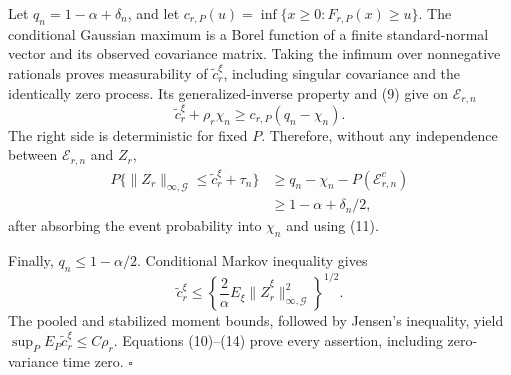 Let \(q_n=1-\alpha+\delta_n\), and let
\(c_{r,P}(u)=\inf\{x\ge0:F_{r,P}(x)\ge u\}\). The conditional Gaussian maximum is a Borel function of a finite standard-normal vector and its observed covariance matrix. Taking the infimum over nonnegative rationals proves measurability of \(\widetilde c_r^\xi\), including singular covariance and the identically zero process. Its generalized-inverse property and (9) give on \(\mathcal E_{r,n}\)
\[
 \widetilde c_r^\xi+\rho_r\chi_n
 \ge c_{r,P}(q_n-\chi_n).                                 \tag{12}
\]
The right side is deterministic for fixed \(P\). Therefore, without any independence between \(\mathcal E_{r,n}\) and \(Z_r\),
\[
\begin{aligned}
 P\{\|Z_r\|_{\infty,\mathcal G}\le
 \widetilde c_r^\xi+\tau_n\}
 &\ge q_n-\chi_n-P(\mathcal E_{r,n}^c)\\
 &\ge1-\alpha+\delta_n/2,
\end{aligned}                                             \tag{13}
\]
after absorbing the event probability into \(\chi_n\) and using (11).

Finally, \(q_n\le1-\alpha/2\). Conditional Markov inequality gives
\[
 \widetilde c_r^\xi\le
 \left\{\frac2\alpha E_\xi
 \|\widehat Z_r^\xi\|_{\infty,\mathcal G}^2\right\}^{1/2}. \tag{14}
\]
The pooled and stabilized moment bounds, followed by Jensen's inequality, yield
\(\sup_PE_P\widetilde c_r^\xi\le C\rho_r\). Equations (10)--(14) prove every assertion, including zero-variance time zero. \(\square\)